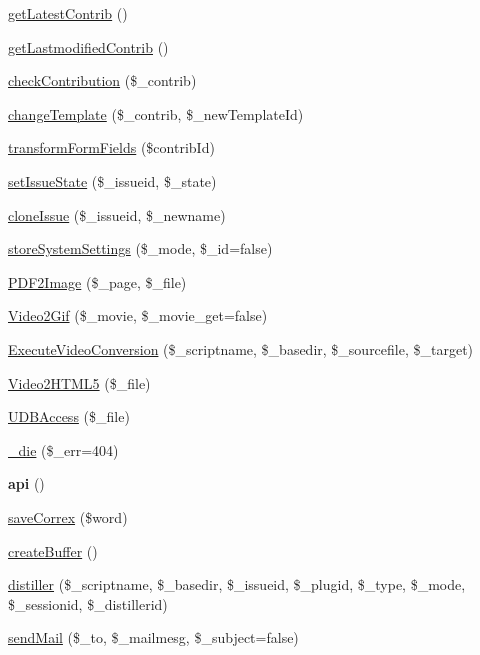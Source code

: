 \begin{DoxyCompactItemize}
\item 
\hyperlink{classrokfor___m_a_i_n_a2cbe085c37c7d0119435dd764ecd8249}{get\-Latest\-Contrib} ()
\item 
\hyperlink{classrokfor___m_a_i_n_a26cee65d017da8b0e7a495235ecfab88}{get\-Lastmodified\-Contrib} ()
\item 
\hyperlink{classrokfor___m_a_i_n_a59496b3185273b4b93f3dcf8e761b873}{check\-Contribution} (\$\-\_\-contrib)
\item 
\hyperlink{classrokfor___m_a_i_n_a307b94ef663fe4112ac1fe973d6d028f}{change\-Template} (\$\-\_\-contrib, \$\-\_\-new\-Template\-Id)
\item 
\hyperlink{classrokfor___m_a_i_n_a928716ecc92e4060f5e4c43e45e9d7fa}{transform\-Form\-Fields} (\$contrib\-Id)
\item 
\hyperlink{classrokfor___m_a_i_n_a9aca1a165afe652dd6442e86eed962e3}{set\-Issue\-State} (\$\-\_\-issueid, \$\-\_\-state)
\item 
\hyperlink{classrokfor___m_a_i_n_a79e5864d13f05f50e8d106602837587d}{clone\-Issue} (\$\-\_\-issueid, \$\-\_\-newname)
\item 
\hyperlink{classrokfor___m_a_i_n_ac6ca1c69b1da1923a8163bfdbe5c442c}{store\-System\-Settings} (\$\-\_\-mode, \$\-\_\-id=false)
\item 
\hyperlink{classrokfor___m_a_i_n_ae0a5da58cb2fc4f8467651e890d98fe5}{\-P\-D\-F2\-Image} (\$\-\_\-page, \$\-\_\-file)
\item 
\hyperlink{classrokfor___m_a_i_n_ad4b183b06cd32eb577b5488edf860f25}{\-Video2\-Gif} (\$\-\_\-movie, \$\-\_\-movie\-\_\-get=false)
\item 
\hyperlink{classrokfor___m_a_i_n_a2d1cd4a1aa90d1c40f00b1be0e0a9918}{\-Execute\-Video\-Conversion} (\$\-\_\-scriptname, \$\-\_\-basedir, \$\-\_\-sourcefile, \$\-\_\-target)
\item 
\hyperlink{classrokfor___m_a_i_n_aee3de7e00dc7d5530790c5bcd937b561}{\-Video2\-H\-T\-M\-L5} (\$\-\_\-file)
\item 
\hyperlink{classrokfor___m_a_i_n_a46671c741148dc7ab50916d5d9f04e45}{\-U\-D\-B\-Access} (\$\-\_\-file)
\item 
\hyperlink{classrokfor___m_a_i_n_a240c532be02b9bdc6b3cb05158b6908e}{\-\_\-die} (\$\-\_\-err=404)
\item 
\hypertarget{classrokfor___m_a_i_n_aa238fcc5cb30759876aa89cd2e0711c1}{
{\bfseries api} ()}
\label{classrokfor___m_a_i_n_aa238fcc5cb30759876aa89cd2e0711c1}

\item 
\hyperlink{classrokfor___m_a_i_n_ac0f74e61f4c93a13b9478b97b0101410}{save\-Correx} (\$word)
\item 
\hyperlink{classrokfor___m_a_i_n_abe720caae7cc384c53fc774c194faf19}{create\-Buffer} ()
\item 
\hyperlink{classrokfor___m_a_i_n_a7aafb54bc6945f0fa91fa15a29581449}{distiller} (\$\-\_\-scriptname, \$\-\_\-basedir, \$\-\_\-issueid, \$\-\_\-plugid, \$\-\_\-type, \$\-\_\-mode, \$\-\_\-sessionid, \$\-\_\-distillerid)
\item 
\hyperlink{classrokfor___m_a_i_n_ab09f062d6502820adcafbe4209dedcd1}{send\-Mail} (\$\-\_\-to, \$\-\_\-mailmesg, \$\-\_\-subject=false)
\end{DoxyCompactItemize}
